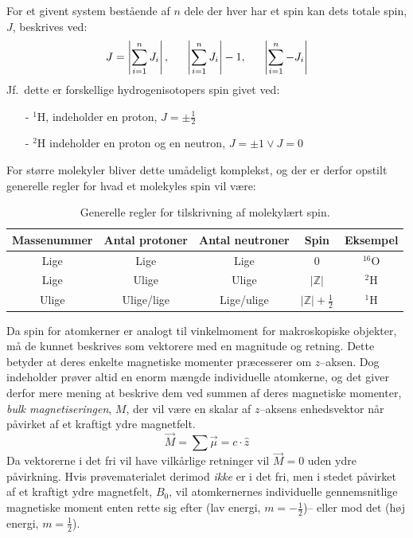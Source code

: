     For et givent system bestående af $n$ dele der hver har et spin kan dets totale spin, $J$, beskrives ved:
    \[
        J=\left|\sum_{i=1}^n J_i\right|, \hskip 16pt \left|\sum_{i=1}^n J_i\right|-1, \hskip 16pt \left|\sum_{i=1}^n -J_i\right|
    \]
    Jf.\ dette er forskellige hydrogenisotopers spin givet ved:
    \begin{itemize}
        \item[-] $^1$H, indeholder en proton, $J=\pm\frac{1}{2}$ 
        \item[-] $^2$H indeholder en proton og en neutron, $J=\pm 1 \vee J=0$ 
    \end{itemize}
    For større molekyler bliver dette umådeligt komplekst, og der er derfor opstilt generelle regler for hvad et molekyles spin vil være:
    \begin{table}[H]\centering
        \caption{Generelle regler for tilskrivning af molekylært spin.}
        \begin{tabular}{ccccc}
            \toprule
            Massenummer & Antal protoner & Antal neutroner & Spin & Eksempel \\
            \midrule
            Lige & Lige & Lige & $0$ & $^{16}$O \\
            Lige & Ulige & Ulige & $\left|\mathbb{Z}\right|$ & $^2$H \\
            Ulige & Ulige/lige & Lige/ulige &  $\left|\mathbb{Z}\right|+\frac{1}{2}$ & $^1$H \\
            \bottomrule
        \end{tabular}
    \end{table}
    Da spin for atomkerner er analogt til vinkelmoment for makroskopiske objekter, må de kunnet beskrives som vektorere med en magnitude og retning. Dette betyder at deres enkelte magnetiske momenter præcesserer om $z$--aksen. Dog indeholder prøver altid en enorm mængde individuelle atomkerne, og det giver derfor mere mening at beskrive dem ved summen af deres magnetiske momenter, \textit{bulk magnetiseringen}, $M$, der vil være en skalar af $z$--aksens enhedsvektor når påvirket af et kraftigt ydre magnetfelt. 
    \[
        \overrightarrow{M}=\sum\overrightarrow{\mu}=c\cdot \hat{z}
    \]
    Da vektorerne i det fri vil have vilkårlige retninger vil $\overrightarrow{M}=0$ uden ydre påvirkning. Hvis prøvematerialet derimod \textit{ikke}  er i det fri, men i stedet påvirket af et kraftigt ydre magnetfelt, $B_0$, vil atomkernernes individuelle gennemsnitlige magnetiske moment enten rette sig efter (lav energi, $m=-\frac{1}{2}$)-- eller mod det (høj energi, $m=\frac{1}{2}$). 
